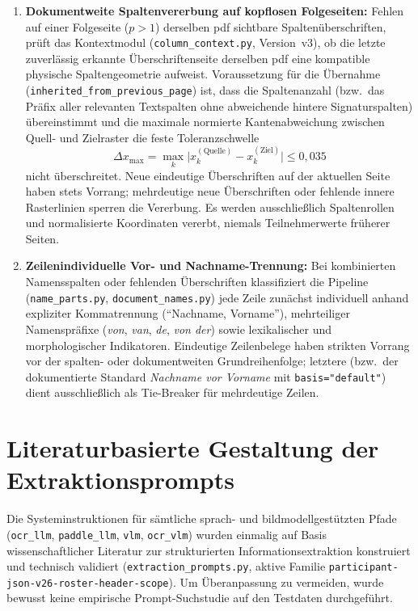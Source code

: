 \begin{enumerate}
  \item \textbf{Dokumentweite Spaltenvererbung auf kopflosen Folgeseiten:} Fehlen auf einer Folgeseite ($p > 1$) derselben \ac{pdf} sichtbare Spaltenüberschriften, prüft das Kontextmodul (\texttt{column\_context.py}, Version~v3), ob die letzte zuverlässig erkannte Überschriftenseite derselben \ac{pdf} eine kompatible physische Spaltengeometrie aufweist. Voraussetzung für die Übernahme (\texttt{inherited\_from\_previous\_page}) ist, dass die Spaltenanzahl (bzw.\ das Präfix aller relevanten Textspalten ohne abweichende hintere Signaturspalten) übereinstimmt und die maximale normierte Kantenabweichung zwischen Quell- und Zielraster die feste Toleranzschwelle
  \begin{equation}
    \Delta x_{\max} = \max_{k} \bigl| x_k^{(\text{Quelle})} - x_k^{(\text{Ziel})} \bigr| \le 0{,}035
    \label{eq:column-tolerance}
  \end{equation}
  nicht überschreitet. Neue eindeutige Überschriften auf der aktuellen Seite haben stets Vorrang; mehrdeutige neue Überschriften oder fehlende innere Rasterlinien sperren die Vererbung. Es werden ausschließlich Spaltenrollen und normalisierte Koordinaten vererbt, niemals Teilnehmerwerte früherer Seiten.
  \item \textbf{Zeilenindividuelle Vor- und Nachname-Trennung:} Bei kombinierten Namensspalten oder fehlenden Überschriften klassifiziert die Pipeline (\texttt{name\_parts.py}, \texttt{document\_names.py}) jede Zeile zunächst individuell anhand expliziter Kommatrennung (\enquote{Nachname, Vorname}), mehrteiliger Namenspräfixe (\emph{von}, \emph{van}, \emph{de}, \emph{von der}) sowie lexikalischer und morphologischer Indikatoren. Eindeutige Zeilenbelege haben strikten Vorrang vor der spalten- oder dokumentweiten Grundreihenfolge; letztere (bzw.\ der dokumentierte Standard \emph{Nachname vor Vorname} mit \texttt{basis="default"}) dient ausschließlich als Tie-Breaker für mehrdeutige Zeilen.
\end{enumerate}

\section{Literaturbasierte Gestaltung der Extraktionsprompts}
\label{sec:methodik-prompts}

Die Systeminstruktionen für sämtliche sprach- und bildmodellgestützten Pfade (\texttt{ocr\_llm}, \texttt{paddle\_llm}, \texttt{vlm}, \texttt{ocr\_vlm}) wurden einmalig auf Basis wissenschaftlicher Literatur zur strukturierten Informationsextraktion konstruiert und technisch validiert (\texttt{extraction\_prompts.py}, aktive Familie \texttt{participant-json-v26-roster-header-scope}). Um Überanpassung zu vermeiden, wurde bewusst keine empirische Prompt-Suchstudie auf den Testdaten durchgeführt.

